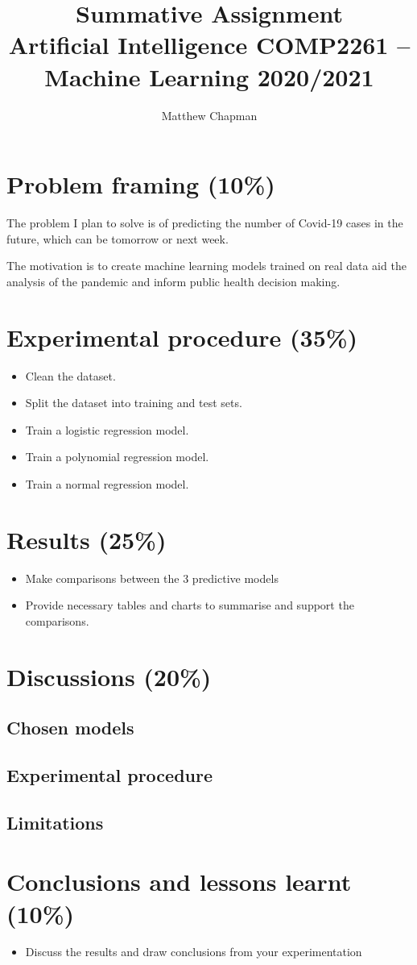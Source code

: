 \documentclass{article}
\title{Summative Assignment \\ 
    Artificial Intelligence COMP2261 – \\
    Machine Learning 2020/2021}
\author{Matthew Chapman}
\begin{document}
\maketitle

\section{Problem framing (10\%)}

The problem I plan to solve is of predicting the number of Covid-19 cases in the future, which can be tomorrow or next week. 

The motivation is to create machine learning models trained on real data aid the analysis of the pandemic and inform public health decision making.   

\section{Experimental procedure (35\%)}
\begin{itemize}
    \item Clean the dataset.
    \item Split the dataset into training and test sets.
    \item Train a logistic regression model.
    \item Train a polynomial regression model.
    \item Train a normal regression model.
\end{itemize}

\section{Results (25\%)}
\begin{itemize}
    \item Make comparisons between the 3 predictive models
    \item Provide necessary tables and charts to summarise and support the comparisons.
\end{itemize}

\section{Discussions (20\%)}
\subsection{Chosen models}
\subsection{Experimental procedure}
\subsection{Limitations}

\section{Conclusions and lessons learnt (10\%)}
\begin{itemize}
    \item Discuss the results and draw conclusions from your experimentation
\end{itemize}

\printbibliography
\end{document}
